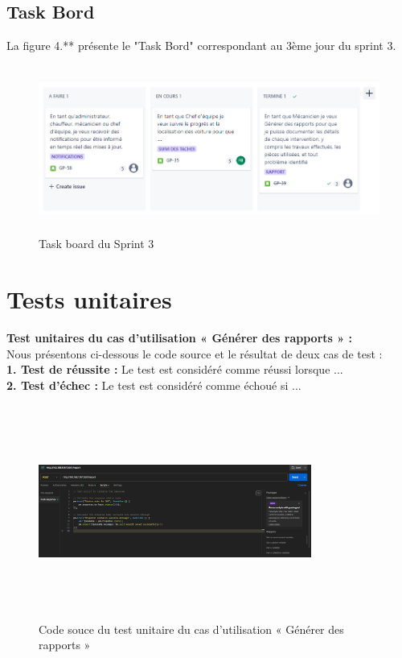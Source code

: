 \subsection{Task Bord}
La figure 4.** présente le "Task Bord" correspondant au 3ème jour du sprint 3.

\begin{figure}[h!]
    \centering
    \includegraphics[width=1\textwidth,height=5.5cm]{chap5.images/task board sprint 3.png}
    \caption{ Task board du Sprint 3 }

\end{figure}

\section{Tests unitaires}

\textbf{Test unitaires du cas d’utilisation « Générer des rapports » :}\\
\bigskip
Nous présentons ci-dessous le code source et le résultat de deux cas de test :\\



\textbf{1. Test de réussite :} Le test est considéré comme réussi lorsque ...\\
\textbf{2. Test d'échec :} Le test est considéré comme échoué si ...

\bigskip

\begin{figure}[h!]
    \centering
    \includegraphics[width=0.8\textwidth, height=7cm]{chap5.images/source test sprint 3.png}
    \caption{ Code souce du test unitaire du cas d’utilisation « Générer des rapports » }

\end{figure}


